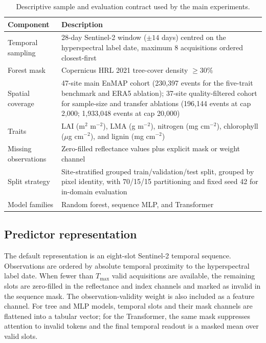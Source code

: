 \documentclass[final,times,onecolumn, authoryear]{elsarticle}
\begin{document}
\begin{linenumbers}
\begin{table}[H]
\centering
\caption{Descriptive sample and evaluation contract used by the main experiments.}
\label{tab:contract}
\begin{tabularx}{\linewidth}{lX}
\toprule
Component & Description \\
\midrule
Temporal sampling & 28-day Sentinel-2 window ($\pm 14$ days) centred on the hyperspectral label date, maximum 8 acquisitions ordered closest-first \\
Forest mask & Copernicus HRL 2021 tree-cover density $\geq 30\%$ \\
Spatial coverage & 47-site main EnMAP cohort (230,397 events for the five-trait benchmark and ERA5 ablation); 37-site quality-filtered cohort for sample-size and transfer ablations (196,144 events at cap 2,000; 1,933,048 events at cap 20,000) \\
Traits & LAI (m$^2$ m$^{-2}$), LMA (g m$^{-2}$), nitrogen (mg cm$^{-2}$), chlorophyll ($\mu$g cm$^{-2}$), and lignin (mg cm$^{-2}$) \\
Missing observations & Zero-filled reflectance values plus explicit mask or weight channel \\
Split strategy & Site-stratified grouped train/validation/test split, grouped by pixel identity, with 70/15/15 partitioning and fixed seed 42 for in-domain evaluation \\
Model families & Random forest, sequence MLP, and Transformer \\
\bottomrule
\end{tabularx}
\end{table}

\subsection{Predictor representation}

The default representation is an eight-slot Sentinel-2 temporal sequence. Observations are ordered by absolute temporal proximity to the hyperspectral label date. When fewer than $T_{\max}$ valid acquisitions are available, the remaining slots are zero-filled in the reflectance and index channels and marked as invalid in the sequence mask. The observation-validity weight is also included as a feature channel. For tree and MLP models, temporal slots and their mask channels are flattened into a tabular vector; for the Transformer, the same mask suppresses attention to invalid tokens and the final temporal readout is a masked mean over valid slots.


\end{linenumbers}
\end{document}
